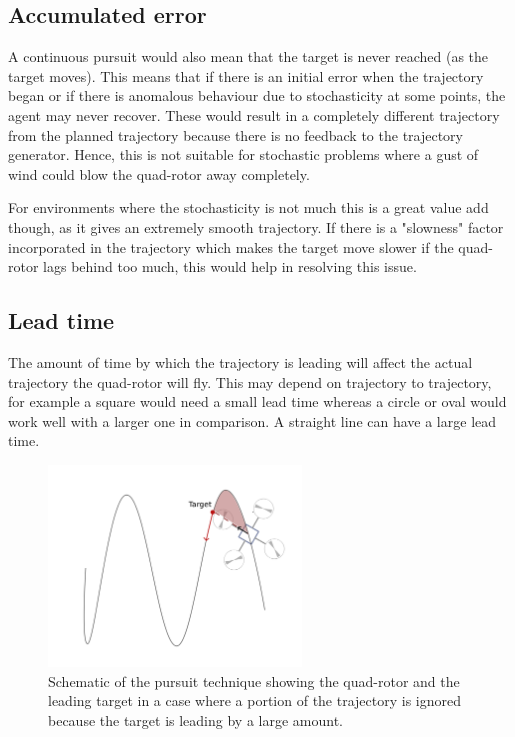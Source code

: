 \documentclass[hidelinks,BTech]{iitmdiss}
\begin{document}
\subsection{Accumulated error}
A continuous pursuit would also mean that the target is never reached (as the target moves). This means that if there is an initial error when the trajectory began or if there is anomalous behaviour due to stochasticity at some points, the agent may never recover. These would result in a completely different trajectory from the planned trajectory because there is no feedback to the trajectory generator. Hence, this is not suitable for stochastic problems where a gust of wind could blow the quad-rotor away completely.

For environments where the stochasticity is not much this is a great value add though, as it gives an extremely smooth trajectory. If there is a "slowness" factor incorporated in the trajectory which makes the target move slower if the quad-rotor lags behind too much, this would help in resolving this issue.

\subsection{Lead time}
The amount of time by which the trajectory is leading will affect the actual trajectory the quad-rotor will fly. This may depend on trajectory to trajectory, for example a square would need a small lead time whereas a circle or oval would work well with a larger one in comparison. A straight line can have a large lead time.

\begin{figure}[H]
  \centering
    \includegraphics[width=0.6\textwidth]{pursuit_con.png}
    \caption{Schematic of the pursuit technique showing the quad-rotor and the leading target in a case where a portion of the trajectory is ignored because the target is leading by a large amount.}
\end{figure}
\end{document}
